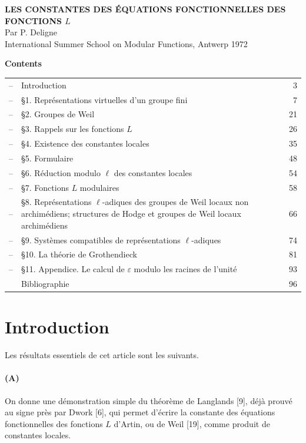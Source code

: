 \documentclass[10pt]{article}
\begin{document}
\begin{center}
{\Large\bfseries LES CONSTANTES DES ÉQUATIONS FONCTIONNELLES DES FONCTIONS \(L\)}\\[2em]
{\large Par P. Deligne}\\[6em]
International Summer School on Modular Functions, Antwerp 1972
\end{center}

\newpage

\begin{center}
\bfseries Contents
\end{center}

\begin{tabularx}{\textwidth}{@{}p{}Xr@{}}
--& Introduction & 3\\
--& \S1. Représentations virtuelles d'un groupe fini & 7\\
--& \S2. Groupes de Weil & 21\\
--& \S3. Rappels sur les fonctions \(L\) & 26\\
--& \S4. Existence des constantes locales & 35\\
--& \S5. Formulaire & 48\\
--& \S6. Réduction modulo \(\ell\) des constantes locales & 54\\
--& \S7. Fonctions \(L\) modulaires & 58\\
--& \S8. Représentations \(\ell\)-adiques des groupes de Weil locaux non archimédiens; structures de Hodge et groupes de Weil locaux archimédiens & 66\\
--& \S9. Systèmes compatibles de représentations \(\ell\)-adiques & 74\\
--& \S10. La théorie de Grothendieck & 81\\
--& \S11. Appendice. Le calcul de \(\varepsilon\) modulo les racines de l'unité & 93\\
& Bibliographie & 96
\end{tabularx}

\newpage

\section*{Introduction}

Les résultats essentiels de cet article sont les suivants.

\paragraph{(A)} On donne une démonstration simple du théorème de Langlands [9], déjà prouvé au signe près par Dwork [6], qui permet d'écrire la constante des équations fonctionnelles des fonctions \(L\) d'Artin, ou de Weil [19], comme produit de constantes locales.
\end{document}
